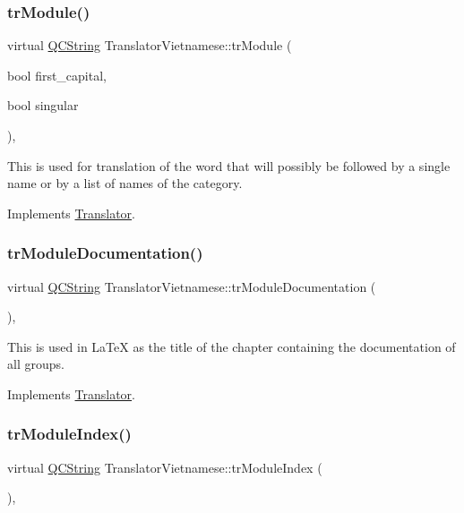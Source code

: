\subsubsection{\texorpdfstring{trModule()}{trModule()}}
{\footnotesize\ttfamily virtual \mbox{\hyperlink{class_q_c_string}{Q\+C\+String}} Translator\+Vietnamese\+::tr\+Module (\begin{DoxyParamCaption}\item[{bool}]{first\+\_\+capital,  }\item[{bool}]{singular }\end{DoxyParamCaption})\hspace{0.3cm}{\ttfamily [inline]}, {\ttfamily [virtual]}}

This is used for translation of the word that will possibly be followed by a single name or by a list of names of the category. 

Implements \mbox{\hyperlink{class_translator}{Translator}}.

\mbox{\label{class_translator_vietnamese_a7a0ab13fb75ff8a434f841000cb65916}} 
\subsubsection{\texorpdfstring{trModuleDocumentation()}{trModuleDocumentation()}}
{\footnotesize\ttfamily virtual \mbox{\hyperlink{class_q_c_string}{Q\+C\+String}} Translator\+Vietnamese\+::tr\+Module\+Documentation (\begin{DoxyParamCaption}{ }\end{DoxyParamCaption})\hspace{0.3cm}{\ttfamily [inline]}, {\ttfamily [virtual]}}

This is used in La\+TeX as the title of the chapter containing the documentation of all groups. 

Implements \mbox{\hyperlink{class_translator}{Translator}}.

\mbox{\label{class_translator_vietnamese_ae58da058fcd193d9f1398b4082cd748d}} 
\subsubsection{\texorpdfstring{trModuleIndex()}{trModuleIndex()}}
{\footnotesize\ttfamily virtual \mbox{\hyperlink{class_q_c_string}{Q\+C\+String}} Translator\+Vietnamese\+::tr\+Module\+Index (\begin{DoxyParamCaption}{ }\end{DoxyParamCaption})\hspace{0.3cm}{\ttfamily [inline]}, {\ttfamily [virtual]}}


